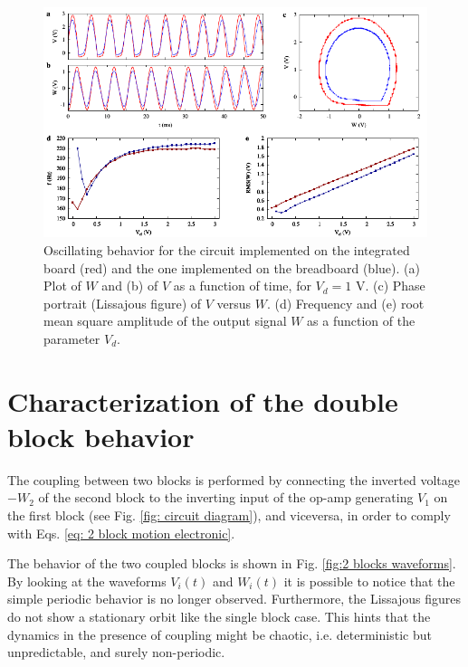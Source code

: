 \begin{figure}[H]
    \centering
    \includegraphics[width=\linewidth]{../1_block/board_new/single_block.pdf}
    \caption{Oscillating behavior for the circuit implemented on
    the integrated board (red) and the one implemented on the breadboard (blue).
    (a) Plot of $W$ and (b) of $V$ as a function of time, for $V_d=1$ V.
    (c) Phase portrait (Lissajous figure) of $V$ versus $W$. (d)
    Frequency and (e) root mean square amplitude of the
    output signal $W$ as a function of the parameter $V_d$.}
    \label{fig:oscillation board}
\end{figure}


\section{Characterization of the double block behavior}
\label{sec: double block characterization}

The coupling between two blocks is performed by connecting the inverted voltage $-W_2$ of the second block to the
inverting input of the op-amp generating $V_1$ on the first block (see Fig. \ref{fig: circuit diagram}), and viceversa, in order
to comply with Eqs. \ref{eq: 2 block motion electronic}.

The behavior of the two coupled blocks is shown in Fig. \ref{fig:2 blocks waveforms}.
By looking at the waveforms $V_i(t)$ and $W_i(t)$ it is possible to notice that the simple periodic behavior
is no longer observed. Furthermore, the Lissajous figures do not show a stationary orbit like the single block case.
This hints that the dynamics in the presence of coupling might be chaotic, i.e. deterministic but unpredictable,
and surely non-periodic.

